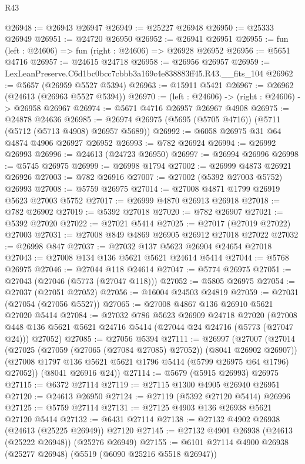 \begin{lexlean}{R43}
\begin{coremodule}
@26948 := @26943 @26947
@26949 := @25227 @26948
@26950 := @25333 @26949
@26951 := @24720 @26950
@26952 := @26941 @26951
@26955 := fun (left : @24606) => fun (right : @24606) => @26928 @26952
@26956 := @5651 @4716
@26957 := @24615 @24718
@26958 := @26956 @26957
@26959 := LexLeanPreserve.C6d1bc0bcc7cbbb3a169c4e838883ff45.R43.__fits_104
@26962 := @5657 (@26959 @5527 @5394)
@26963 := @15911 @5421
@26967 := @26962 (@24613 (@26963 @5527 @5394))
@26970 := (left : @24606) -> (right : @24606) -> @26958 @26967
@26974 := @5671 @4716 @26957 @26967 @4908
@26975 := @24878 @24636
@26985 := @26974 @26975 (@5695 (@5705 @4716)) (@5711 (@5712 (@5713 @4908) @26957 @5689))
@26992 := @6058 @26975 @31 @64 @4874 @4906 @26927 @26952
@26993 := @782 @26924
@26994 := @26992 @26993
@26996 := @24613 (@24723 @26950)
@26997 := @26994 @26996
@26998 := @5745 @26975
@26999 := @26998 @1794
@27002 := @26999 @4873 @26921 @26926
@27003 := @782 @26916
@27007 := @27002 (@5392 @27003 @5752) @26993
@27008 := @5759 @26975
@27014 := @27008 @4871 @1799 @26919 @5623 @27003 @5752
@27017 := @26999 @4870 @26913 @26918
@27018 := @782 @26902
@27019 := @5392 @27018
@27020 := @782 @26907
@27021 := @5392 @27020
@27022 := @27021 @5414
@27025 := @27017 (@27019 @27022) @27003
@27031 := @27008 @849 @4869 @26905 @26912 @27018 @27022
@27032 := @26998 @847
@27037 := @27032 @137 @5623 @26904 @24654 @27018
@27043 := @27008 @134 @136 @5621 @5621 @24614 @5414
@27044 := @5768 @26975
@27046 := @27044 @118 @24614
@27047 := @5774 @26975
@27051 := @27043 (@27046 (@5773 (@27047 @118)))
@27052 := @5805 @26975
@27054 := @27037 (@27051 @27052)
@27056 := @16004 @24503 @24819
@27059 := @27031 (@27054 (@27056 @5527))
@27065 := @27008 @4867 @136 @26910 @5621 @27020 @5414
@27084 := @27032
    @786
    @5623
    @26909
    @24718
    @27020
    (@27008 @448 @136 @5621 @5621 @24716 @5414 (@27044 @24 @24716 (@5773 (@27047 @24))) @27052)
@27085 := @27056 @5394
@27111 := @26997
    (@27007
      (@27014
        (@27025 (@27059 (@27065 (@27084 @27085) @27052)) (@8041 @26902 @26907))
        (@27008 @1797 @136 @5621 @5621 @1796 @5414 (@5799 @26975 @64 @1796) @27052))
      (@8041 @26916 @24))
@27114 := @5679 (@5915 @26993) @26975
@27115 := @6372 @27114
@27119 := @27115 @1300 @4905 @26940 @26951
@27120 := @24613 @26950
@27124 := @27119 (@5392 @27120 @5414) @26996
@27125 := @5759 @27114
@27131 := @27125 @4903 @136 @26938 @5621 @27120 @5414
@27132 := @6431 @27114
@27138 := @27132 @4902 @26938 (@24613 (@25225 @26949)) @27120
@27145 := @27132 @4901 @26938 (@24613 (@25222 @26948)) (@25276 @26949)
@27155 := @6101 @27114 @4900 @26938 (@25277 @26948) (@5519 (@6090 @25216 @5518 @26947))

\end{coremodule}
\end{lexlean}
